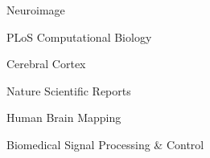 
\fontsize{9pt}{1em}\bodyfontlight\upshape\color{text}
\vspace{2mm}

\begin{cvitems}
    \item {Neuroimage}
    \item {PLoS Computational Biology}
    \item {Cerebral Cortex}
    \item {Nature Scientific Reports}
    \item {Human Brain Mapping}
    \item {Biomedical Signal Processing & Control}
\end{cvitems}

\vspace{2mm}
